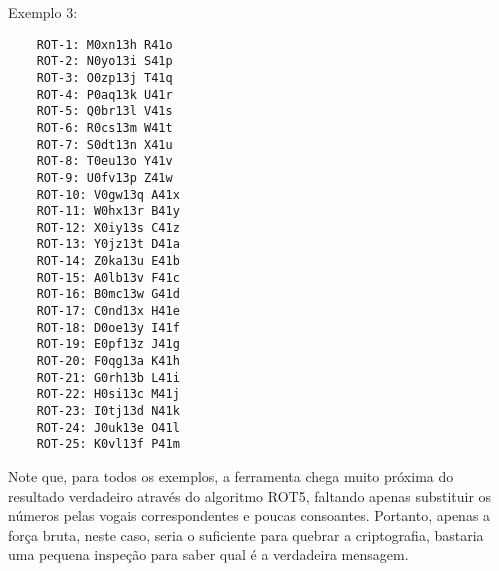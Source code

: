 \documentclass[12pt]{article}
\begin{document}
Exemplo 3:

\begin{verbatim}
	ROT-1: M0xn13h R41o
	ROT-2: N0yo13i S41p
	ROT-3: O0zp13j T41q
	ROT-4: P0aq13k U41r
	ROT-5: Q0br13l V41s
	ROT-6: R0cs13m W41t
	ROT-7: S0dt13n X41u
	ROT-8: T0eu13o Y41v
	ROT-9: U0fv13p Z41w
	ROT-10: V0gw13q A41x
	ROT-11: W0hx13r B41y
	ROT-12: X0iy13s C41z
	ROT-13: Y0jz13t D41a
	ROT-14: Z0ka13u E41b
	ROT-15: A0lb13v F41c
	ROT-16: B0mc13w G41d
	ROT-17: C0nd13x H41e
	ROT-18: D0oe13y I41f
	ROT-19: E0pf13z J41g
	ROT-20: F0qg13a K41h
	ROT-21: G0rh13b L41i
	ROT-22: H0si13c M41j
	ROT-23: I0tj13d N41k
	ROT-24: J0uk13e O41l
	ROT-25: K0vl13f P41m
\end{verbatim}

Note que, para todos os exemplos, a ferramenta chega muito próxima do resultado verdadeiro através do
algoritmo ROT5, faltando apenas substituir os números pelas vogais correspondentes e poucas consoantes.
Portanto, apenas a força bruta, neste caso, seria o suficiente para quebrar a criptografia, bastaria uma
pequena inspeção para saber qual é a verdadeira mensagem.
\end{document}
